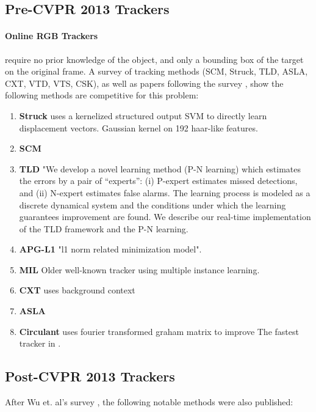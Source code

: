 \subsection{Pre-CVPR 2013 Trackers}
\paragraph{Online RGB Trackers} require no prior knowledge of the object, and only a bounding box of the target on the original frame. 
A survey of tracking methods \cite{wu2013online} (SCM, Struck, TLD, ASLA, CXT, VTD, VTS, CSK), as well as papers following the survey \cite{supancic2013self}, show the following methods are competitive for this problem:
\begin{enumerate}
\item \textbf{Struck} \cite{hare2011struck}  uses a kernelized structured output SVM to directly learn displacement vectors. Gaussian kernel on 192 haar-like features. 
\item \textbf{SCM} \cite{zhong2012robust} 
\item \textbf{TLD} \cite{kalal2012tracking} "We develop a novel learning method (P-N learning) which estimates the
errors by a pair of “experts”: (i) P-expert estimates missed detections, and (ii) N-expert estimates false alarms. The learning process is
modeled as a discrete dynamical system and the conditions under which the learning guarantees improvement are found. We describe
our real-time implementation of the TLD framework and the P-N learning.

\item \textbf{APG-L1} \cite{bao2012real} "l1 norm related minimization model".
\item \textbf{MIL} \cite{babenko2009visual} Older well-known tracker using multiple instance learning.
\item \textbf{CXT} \cite{dinh2011context} uses background context
\item \textbf{ASLA} \cite{jia2012visual} 
\item \textbf{Circulant} \cite{henriques2012exploiting} uses fourier transformed graham matrix to improve  The fastest tracker in \cite{wu2013online}.
\end{enumerate}


\subsection{Post-CVPR 2013 Trackers}
After Wu et. al's  survey \cite{wu2013online}, the following notable methods were also published:

